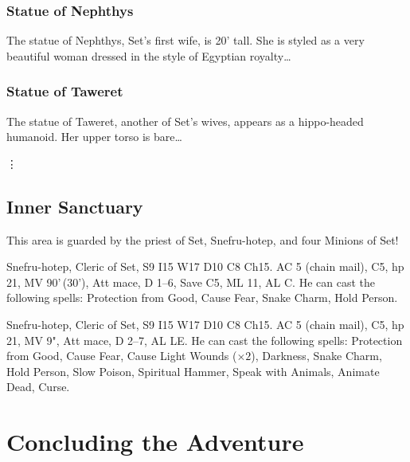 \documentclass[letterpaper,serif]{module}
\begin{document}
\lipsum[8]

\subsubsection{Statue of Nephthys} %
\label{west_court}

The statue of Nephthys, Set's first wife, is 20' tall. She is styled as a very beautiful woman dressed in the
style of Egyptian royalty\ldots

\subsubsection{Statue of Taweret} %

The statue of Taweret, another of Set's wives, appears as a hippo-headed humanoid. Her upper torso is bare\ldots

\vdots

\setcounter{subsection}{13} %

\subsection{Inner Sanctuary} %
\label{inner_sanctuary}

This area is guarded by the priest of Set, Snefru-hotep, and four Minions of Set!
\begin{statblockfreestyle}
\begin{ifbasicstats}
Snefru-hotep, Cleric of Set, S9 I15 W17 D10 C8 Ch15. AC 5 (chain mail), C5, hp 21, MV 90'\,(30'), Att mace, D 1--6, Save C5, ML 11, AL C.
He can cast the following spells: Protection from Good, Cause Fear, Snake Charm, Hold Person.
\end{ifbasicstats}
\begin{ifadvancedstats}
Snefru-hotep, Cleric of Set, S9 I15 W17 D10 C8 Ch15. AC 5 (chain mail), C5, hp 21, MV 9", Att mace, D 2--7, AL LE.
He can cast the following spells: Protection from Good, Cause Fear, Cause Light Wounds ($\times 2$), Darkness,
Snake Charm, Hold Person, Slow Poison, Spiritual Hammer, Speak with Animals, Animate Dead, Curse.
\end{ifadvancedstats}
\end{statblockfreestyle}
\lipsum[9]

\section{Concluding the Adventure}
\end{document}
